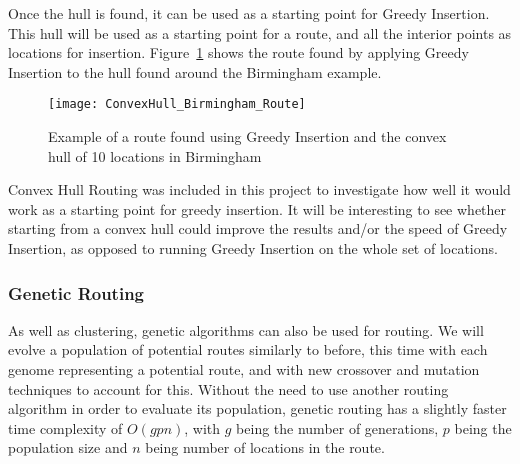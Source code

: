 \noindent
Once the hull is found, it can be used as a starting point for Greedy Insertion.
This hull will be used as a starting point for a route, and all the interior points as locations for insertion.
Figure~\ref{fig:ConvexHull_Birmingham_Route} shows the route found by applying Greedy Insertion to the hull found
around the Birmingham example.
\begin{figure}[H]
    \centering
    \texttt{[image: ConvexHull\_Birmingham\_Route]}
    \caption{Example of a route found using Greedy Insertion and the convex hull of 10 locations in Birmingham}
    \label{fig:ConvexHull_Birmingham_Route}
\end{figure}

\noindent
Convex Hull Routing was included in this project to investigate how well it would work as a starting point for greedy
insertion.
It will be interesting to see whether starting from a convex hull could improve the results and/or the speed of
Greedy Insertion, as opposed to running Greedy Insertion on the whole set of locations.

\subsubsection{Genetic Routing}\label{subsubsec:genetic-routing}
As well as clustering, genetic algorithms can also be used for routing.
We will evolve a population of potential routes similarly to before, this time with each genome representing a
potential route, and with new crossover and mutation techniques to account for this.
Without the need to use another routing algorithm in order to evaluate its population, genetic routing has a
slightly faster time complexity of $O(g p n)$, with $g$ being the number of generations, $p$ being the population
size and $n$ being number of locations in the route.\\

